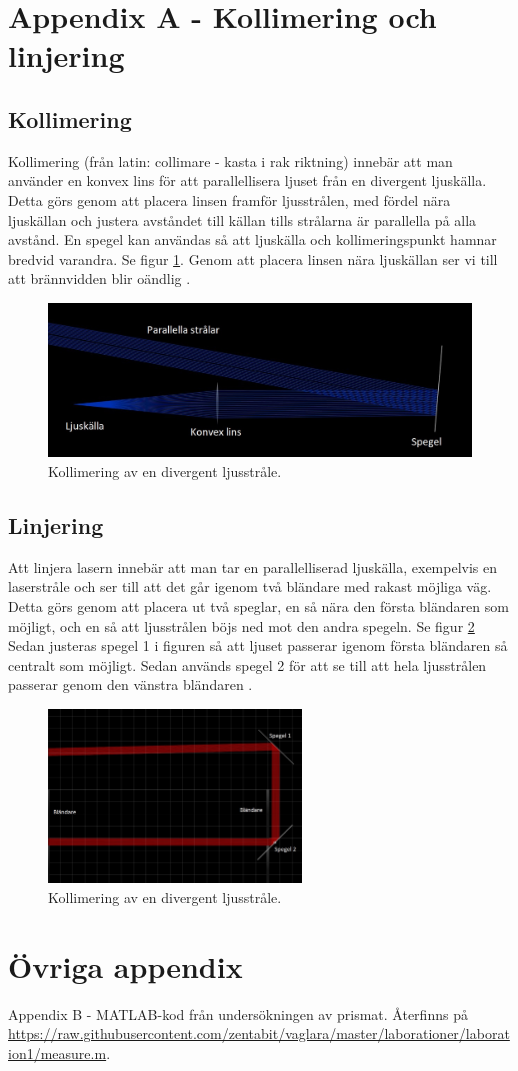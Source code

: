\documentclass[a4paper]{article}
\begin{document}
\pagebreak
\section{Appendix A - Kollimering och linjering}
\subsection{Kollimering}
Kollimering (från latin: collimare - kasta i rak riktning) innebär att man använder en konvex lins
för att parallellisera ljuset från en divergent ljuskälla. Detta görs genom att placera linsen
framför ljusstrålen, med fördel nära ljuskällan och justera avståndet till källan tills strålarna är parallella
på alla avstånd. En spegel kan användas så att ljuskälla och kollimeringspunkt hamnar bredvid varandra. Se figur \ref{fig:kollimering}.
Genom att placera linsen nära ljuskällan ser vi till att brännvidden blir oändlig \cite{yt1}.
\begin{figure}[h]
    \includegraphics[width=\textwidth]{kollimera3.jpg}
    \caption{Kollimering av en divergent ljusstråle.}
    \label{fig:kollimering}
\end{figure}
\subsection{Linjering}
Att linjera lasern innebär att man tar en parallelliserad ljuskälla, exempelvis en laserstråle och ser till att det går igenom två bländare med rakast möjliga väg.
Detta görs genom att placera ut två speglar, en så nära den första bländaren som möjligt, och en så att ljusstrålen böjs ned mot den andra spegeln. Se figur \ref{fig:linjering}
Sedan justeras spegel 1 i figuren så att ljuset passerar igenom första bländaren så centralt som möjligt. Sedan används spegel 2 för att se till att hela ljusstrålen passerar
genom den vänstra bländaren \cite{yt2}.
\begin{figure}[h]
    \centering
    \includegraphics[width=0.6\textwidth]{linjera4.jpg}
    \caption{Kollimering av en divergent ljusstråle.}
    \label{fig:linjering}
\end{figure}
\pagebreak
\section{Övriga appendix}
Appendix B - MATLAB-kod från undersökningen av prismat. Återfinns på \url{https://raw.githubusercontent.com/zentabit/vaglara/master/laborationer/laboration1/measure.m}.
\end{document}
